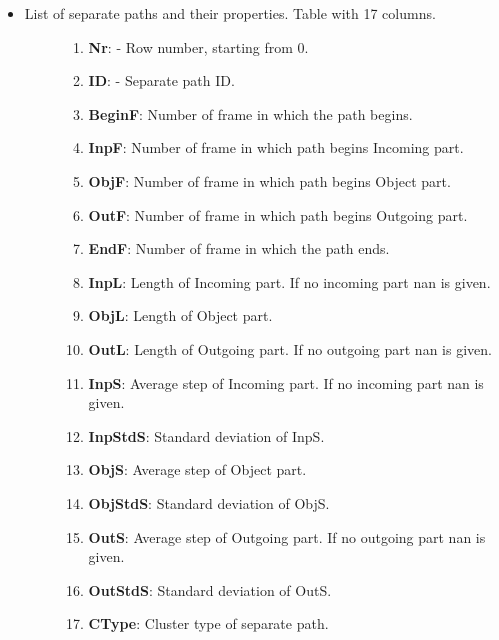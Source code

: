 \documentclass[a4paper,10pt,english]{sphinxmanual}
\begin{document}
\begin{itemize}
\begin{description}
\end{description}

\item {} \begin{description}
\item[{List of separate paths and their properties. Table with 17 columns.}] \leavevmode\begin{enumerate}
\item {} 
\textbf{Nr}: - Row number, starting from 0.

\item {} 
\textbf{ID}: - Separate path ID.

\item {} 
\textbf{BeginF}: Number of frame in which the path begins.

\item {} 
\textbf{InpF}: Number of frame in which path begins Incoming part.

\item {} 
\textbf{ObjF}: Number of frame in which path begins Object part.

\item {} 
\textbf{OutF}: Number of frame in which path begins Outgoing part.

\item {} 
\textbf{EndF}: Number of frame in which the path ends.

\item {} 
\textbf{InpL}: Length of Incoming part. If no incoming part nan is given.

\item {} 
\textbf{ObjL}: Length of Object part.

\item {} 
\textbf{OutL}: Length of Outgoing part. If no outgoing part nan is given.

\item {} 
\textbf{InpS}: Average step of Incoming part. If no incoming part nan is given.

\item {} 
\textbf{InpStdS}: Standard deviation of InpS.

\item {} 
\textbf{ObjS}: Average step of Object part.

\item {} 
\textbf{ObjStdS}: Standard deviation of ObjS.

\item {} 
\textbf{OutS}: Average step of Outgoing part. If no outgoing part nan is given.

\item {} 
\textbf{OutStdS}: Standard deviation of OutS.

\item {} 
\textbf{CType}: Cluster type of separate path.

\end{enumerate}

\end{description}

\end{itemize}
\end{document}
